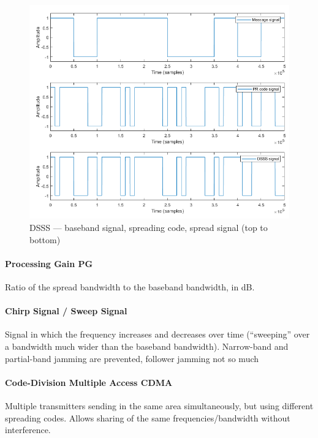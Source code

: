 \begin{figure}[h]
	\centering
	\includegraphics[scale=0.6]{images/2-dsss.png}
	\caption{DSSS --- baseband signal, spreading code, spread signal (top to bottom)}%
	\label{fig:dsss}
\end{figure}

\paragraph{Processing Gain PG}
Ratio of the spread bandwidth to the baseband bandwidth, in dB.


\paragraph{Chirp Signal / Sweep Signal}
Signal in which the frequency increases and decreases over time (``sweeping'' over a bandwidth much wider than the baseband bandwidth).
Narrow-band and partial-band jamming are prevented, follower jamming not so much

\paragraph{Code-Division Multiple Access CDMA}
Multiple transmitters sending in the same area simultaneously, but using different spreading codes.
Allows sharing of the same frequencies/bandwidth without interference.
